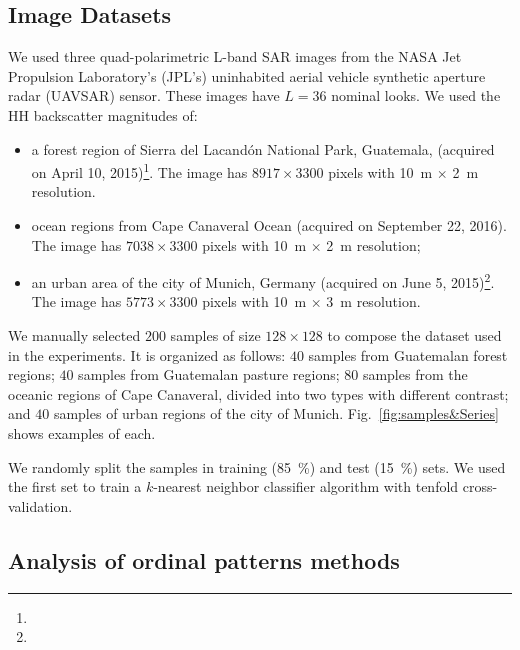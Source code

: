 \documentclass[journal]{IEEEtran}
\begin{document}
	
	\subsection{Image Datasets}
	
	We used three quad-polarimetric L-band SAR images from the NASA Jet Propulsion Laboratory’s (JPL’s) uninhabited aerial vehicle synthetic aperture radar (UAVSAR) sensor.
	These images have $L=36$ nominal looks.
	We used the HH backscatter magnitudes of:
	\begin{itemize}
		\item a forest region of Sierra del Lacandón National Park, Guatemala, (acquired on April 10, 2015)\footnote{}. 
		The image has $8917 \times 3300$ pixels with 
		\SI[inter-unit-product =$\cdot$]{10}{\meter} $\times$ \SI[inter-unit-product =$\cdot$]{2}{\meter} resolution.
		\item ocean regions from Cape Canaveral Ocean (acquired on September 22, 2016).
		The image has $7038 \times 3300$ pixels with 
		\SI[inter-unit-product =$\cdot$]{10}{\meter} $\times$ \SI[inter-unit-product =$\cdot$]{2}{\meter} resolution;
		\item an urban area of the city of Munich, Germany (acquired on June 5, 2015)\footnote{}.
		The image has $5773 \times 3300$ pixels with 
		\SI[inter-unit-product =$\cdot$]{10}{\meter} $\times$ \SI[inter-unit-product =$\cdot$]{3}{\meter} resolution.
	\end{itemize}
	
	We manually selected $200$ samples of size $128 \times 128$ to compose the dataset used in the experiments.
	It is organized as follows:
	$40$ samples from Guatemalan forest regions;
	$40$ samples from Guatemalan pasture regions;
	$80$ samples from the oceanic regions of Cape Canaveral, divided into two types with different contrast; and
	$40$ samples of urban regions of the city of Munich.
	Fig.~\ref{fig:samples&Series} shows examples of each.
	
	We randomly split the samples in training (\SI{85}{\percent}) and test (\SI{15}{\percent}) sets.
	We used the first set to train a $k$-nearest neighbor classifier algorithm with tenfold cross-validation.
	
	\subsection{Analysis of ordinal patterns methods}
	
\end{document}
